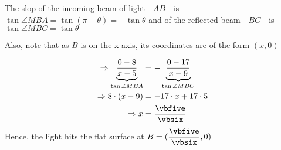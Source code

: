 \begin{solution}
	The slop of the incoming beam of light - $AB$ - is $\tan\angle{MBA} = \tan (\pi-\theta) = -\tan\theta$ 
	and of the reflected beam - $BC$ - is $\tan\angle{MBC} = \tan\theta$
	
	Also, note that as $B$ is on the x-axis, its coordinates are of the form $(x,0)$
	
	\begin{align}
		\Rightarrow \underbrace{\dfrac{0-\vbtwo}{x-\vbone}}_{\tan\angle{MBA}} &= 
		-\underbrace{\dfrac{0-\vbfour}{x-\vbthree}}_{\tan\angle{MBC}} \\
		\Rightarrow \vbtwo\cdot(x-\vbthree) &= -\vbfour\cdot x + \vbfour\cdot\vbone \\
		\Rightarrow x &= \dfrac{\vbfive}{\vbsix}
	\end{align}
	Hence, the light hits the flat surface at $B = (\dfrac{\vbfive}{\vbsix}, 0)$
	
\end{solution}
